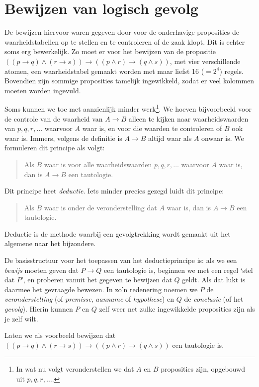 \chapter{Bewijzen van logisch gevolg}\label{ch:bewijzen}
De bewijzen hiervoor waren gegeven door voor de onderhavige proposities de waarheidstabellen op te stellen en te controleren of de zaak klopt. Dit is echter soms erg bewerkelijk. Zo moet er voor het bewijzen van de propositie $((p\rightarrow q)\land(r\rightarrow s))\rightarrow((p\land r)\rightarrow(q\land s))$, met vier verschillende atomen, een waarheidstabel gemaakt worden met maar liefst 16 ($=2^4$) regels. Bovendien zijn sommige proposities tamelijk ingewikkeld, zodat er veel kolommen moeten worden ingevuld.

Soms kunnen we toe met aanzienlijk minder werk\footnote{In wat nu volgt veronderstellen we dat $A$ en $B$ proposities zijn, opgebouwd uit $p, q, r, \ldots$.}. We hoeven bijvoorbeeld voor de controle van de waarheid van $A\rightarrow B$ alleen te kijken naar waarheidswaarden van $p,q,r, \ldots$ waarvoor $A$ waar is, en voor die waarden te controleren of $B$ ook waar is. Immers, volgens de definitie is $A\rightarrow B$ altijd waar als $A$ onwaar is. We formuleren dit principe als volgt:

\begin{quote}
Als $B$ waar is voor alle waarheidswaarden $p, q, r, \ldots$ waarvoor $A$ waar is, dan is $A\rightarrow B$ een tautologie.
\end{quote}
%
Dit principe heet \textit{deductie}. Iets minder precies gezegd luidt dit principe:
\begin{quote}
Als $B$ waar is onder de veronderstelling dat $A$ waar is, dan is $A\rightarrow B$ een tautologie.
\end{quote}
%
Deductie is de methode waarbij een gevolgtrekking wordt gemaakt uit het algemene naar het bijzondere.

De basisstructuur voor het toepassen van het deductieprincipe is: als we een \textit{bewijs} moeten geven dat $P\rightarrow Q$ een tautologie is, beginnen we met een regel `stel dat $P$', en proberen vanuit het gegeven te bewijzen dat $Q$ geldt. Als dat lukt is daarmee het gevraagde bewezen. In zo'n redenering noemen we $P$ de \textit{veronderstelling} (of \textit{premisse}, \textit{aanname} of \textit{hypothese}) en $Q$ de \textit{conclusie} (of het \textit{gevolg}). Hierin kunnen $P$ en $Q$ zelf weer net zulke ingewikkelde proposities zijn als je zelf wilt.

Laten we als voorbeeld bewijzen dat $((p\rightarrow q)\land(r\rightarrow s))\rightarrow((p\land r)\rightarrow(q\land s))$ een tautologie is.

